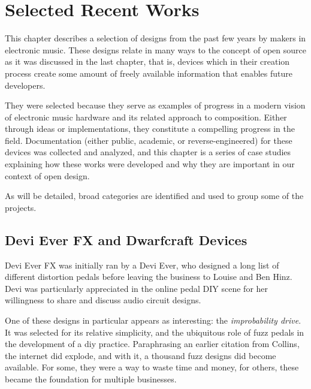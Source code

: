\chapter{Selected Recent Works}\label{selrecworks}

This chapter describes a selection of designs from the past few years by makers in electronic music. These designs relate in many ways to the concept of open source as it was discussed in the last chapter, that is, devices which in their creation process create some amount of freely available information that enables future developers.

They were selected because they serve as examples of progress in a modern vision of electronic music hardware and its related approach to composition. Either through ideas or implementations, they constitute a compelling progress in the field. Documentation (either public, academic, or reverse-engineered) for these devices was collected and analyzed, and this chapter is a series of case studies explaining how these works were developed and why they are important in our context of open design. 

As will be detailed, broad categories are identified and used to group some of the projects. 

\section{Devi Ever FX and Dwarfcraft Devices}

Devi Ever FX was initially ran by a Devi Ever, who designed a long list of different distortion pedals before leaving the business to Louise and Ben Hinz. Devi was particularly appreciated in the online pedal DIY scene for her willingness to share and discuss audio circuit designs. 

One of these designs in particular appears as interesting: the \emph{improbability drive}. It was selected for its relative simplicity, and the ubiquitous role of fuzz pedals in the development of a diy practice. Paraphrasing an earlier citation from Collins, the internet did explode, and with it, a thousand fuzz designs did become available. For some, they were a way to waste time and money, for others, these became the foundation for multiple businesses. 

